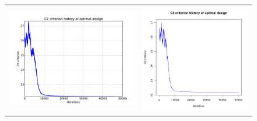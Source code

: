 \begin{figure}[!h]
\begin{center}
\begin{tabular}{>{\centering\arraybackslash}m{8cm}>{\centering\arraybackslash}m{8cm}}
 \includegraphics[scale=0.35]{otlhs_c2_crit_big.png} & \includegraphics[scale=0.35]{dice_c2_crit_big.png}\\

\end{tabular}
\end{center}
\end{figure}

